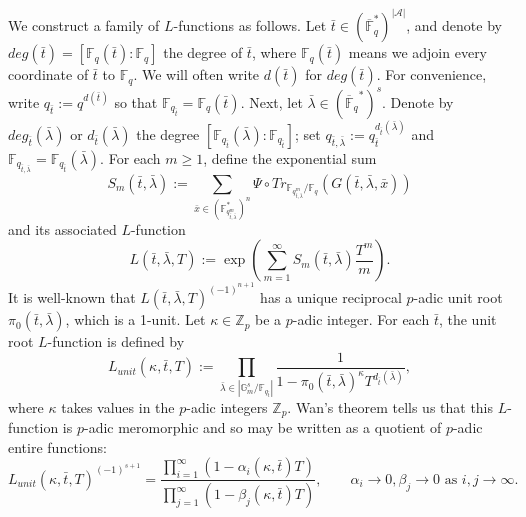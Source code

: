 \documentclass{article}
\theoremstyle{remark}
\def\bb #1{ {\mathbb #1} }
\def\c #1{ {\mathcal #1} }
\begin{document}
We construct a family of $L$-functions as follows. Let $\bar t \in (\overline{\bb F}_q^*)^{|\c {A}|}$, and denote by $deg(\bar t) = [\bb F_q(\bar t) : \bb F_q]$ the degree of $\bar t$, where $\bb F_q(\bar t)$ means we adjoin every coordinate of $\bar t$ to $\bb F_q$. We will often write $d(\bar t)$ for $deg(\bar t)$. For convenience, write $q_{\bar t} := q^{d(\bar t)}$ so that $\bb F_{q_{\bar t}} = \bb F_q(\bar t)$. Next, let $\bar \lambda \in ({\overline{\bb F}_q}^*)^{s}$. Denote by $deg_{\bar t}(\bar \lambda)$ or $d_{\bar t}(\bar \lambda)$ the degree $[\bb F_{q_{\bar t}}(\bar \lambda) : \bb F_{q_{\bar t}}]$; set $q_{\bar t,\bar \lambda} := q_{\bar t}^{d_{\bar t}(\bar \lambda)}$ and  $\bb F_{q_{\bar t, \bar \lambda}} = \bb F_{q_{\bar t}}(\bar \lambda)$. For each $m \geq 1$, define the exponential sum
\[
S_m(\bar t, \bar \lambda) := \sum_{\bar x \in (\bb F_{{q^m_{\bar t, \bar \lambda}}}^*)^n}  \Psi \circ Tr_{\bb F_{q_{\bar t, \bar \lambda}^m} / \bb F_q}( G(\bar t, \bar \lambda, \bar x))
\]
and its associated $L$-function
\[
L(\bar t, \bar \lambda, T) := \exp\left( \sum_{m=1}^\infty S_m(\bar t, \bar \lambda) \frac{T^m}{m} \right).
\]
It is well-known \cite{MR2966711} that $L(\bar t, \bar \lambda, T)^{(-1)^{n+1}}$ has a unique reciprocal $p$-adic unit root $\pi_0(\bar t, \bar \lambda)$, which is a 1-unit. Let $\kappa \in \bb {Z}_p$ be a $p$-adic integer.  For each $\bar t$, the unit root $L$-function is defined by
\[
L_{unit}(\kappa, \bar t, T) := \prod_{\bar \lambda \in | \bb G_m^{s} / \bb F_{q_{\bar t}}|} \frac{1}{1 - \pi_0(\bar t, \bar \lambda)^\kappa T^{d_{\bar t}(\bar \lambda)}},
\]
where $\kappa$ takes values in the $p$-adic integers $\bb Z_p$. Wan's theorem tells us that this $L$-function is $p$-adic meromorphic and so may be written as a quotient of $p$-adic entire functions:
\[
L_{unit}(\kappa, \bar t, T)^{(-1)^{s+1}} = \frac{\prod_{i=1}^\infty (1 - \alpha_i(\kappa, \bar t) T)}{\prod_{j=1}^\infty (1 - \beta_j(\kappa, \bar t) T)}, \qquad \alpha_i \rightarrow 0, \beta_j \rightarrow 0 \text{ as } i, j \rightarrow \infty.
\]
\end{document}
